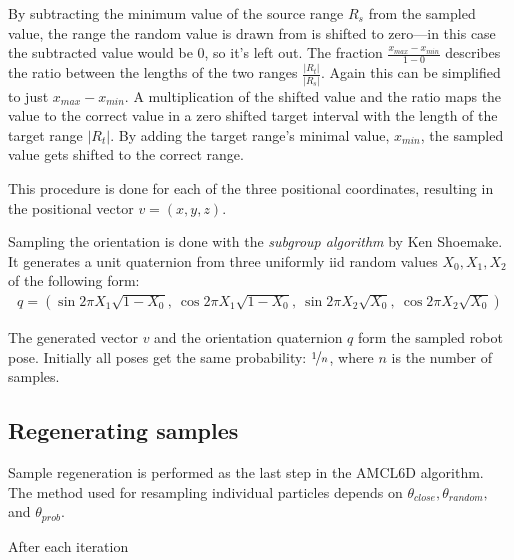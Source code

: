 \documentclass[Thesis.tex]{subfiles}
\begin{document}
By subtracting the minimum value of the source range $R_s$ from the sampled value, the range the random value is drawn from is shifted to zero---in this case the subtracted value would be $0$, so it's left out. The fraction $\frac{ x_{max} - x_{min} }{ 1 - 0 }$ describes the ratio between the lengths of the two ranges $\frac{|R_t|}{|R_s|}$. Again this can be simplified to just $x_{max}-x_{min}$. A multiplication of the shifted value and the ratio maps the value to the correct value in a zero shifted target interval with the length of the target range $|R_t|$. By adding the target range's minimal value, $x_{min}$, the sampled value gets shifted to the correct range.

This procedure is done for each of the three positional coordinates, resulting in the positional vector $v = \left(x, y, z\right)$.

Sampling the orientation is done with the \emph{subgroup algorithm} by Ken Shoemake\cite[p.~129-130]{gfxgems:1995}. It generates a unit quaternion from three uniformly \gls{iid} random values $X_0, X_1, X_2$ of the following form:
%
\begin{align}
q = \left( \sin{2\pi X_1}\sqrt{1-X_0},\: \cos{2\pi X_1}\sqrt{1-X_0},\: 
           \sin{2\pi X_2}\sqrt{  X_0},\: \cos{2\pi X_2}\sqrt{  X_0} \right)
\end{align}


The generated vector $v$ and the orientation quaternion $q$ form the sampled robot pose. Initially all poses get the same probability: $\nicefrac{1}{n}$, where $n$ is the number of samples.

\subsection{Regenerating samples}
Sample regeneration is performed as the last step in the \gls{AMCL6D} algorithm. The method used for resampling individual particles depends on $\theta_{close}, \theta_{random},$ and $\theta_{prob}$.

After each iteration 
\end{document}

